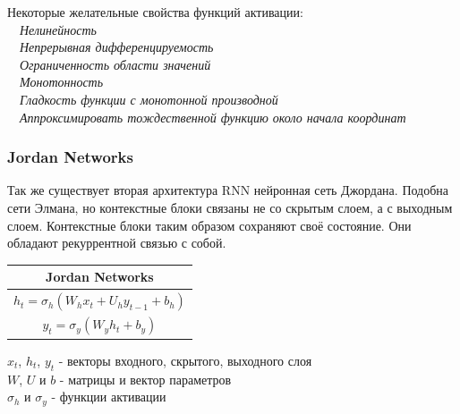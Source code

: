 	\begin{tabbing}
	    Некоторые желательные свойства функций активации:\\
		\ \ \textit{Нелинейность} \\
		\ \ \textit{Непрерывная дифференцируемость} \\
		\ \ \textit{Ограниченность области значений} \\
		\ \ \textit{Монотонность} \\
		\ \ \textit{Гладкость функции с монотонной производной} \\
		\ \ \textit{Аппроксимировать тождественной функцию около начала координат} \\
	\end{tabbing}
	
	\subsubsection{Jordan Networks}
    
    Так же существует вторая архитектура RNN нейронная сеть Джордана. Подобна сети Элмана, но контекстные блоки связаны не со скрытым слоем, а с выходным слоем. Контекстные блоки таким образом сохраняют своё состояние. Они обладают рекуррентной связью с собой.
    
	\begin{table}[h]
			\centering
			\begin{tabular}{|c|} 
				\hline
				\textbf{Jordan Networks}  \\ 
				\hline
				$	h_{t} = \sigma_{h}(W_h x_t + U_h y_{t - 1} + b_h) $  \\
				$	y_{t} = \sigma_{y}(W_y h_t + b_y) $ \\
				\hline
			\end{tabular}
	\end{table}
	
	\begin{tabbing}
		$x_t$, $h_t$, $y_t$  - векторы входного, скрытого, выходного слоя        \\
		$W$, $U$ и $b$ - матрицы и вектор параметров       \\
		$\sigma_h$ и $\sigma_y$ - функции активации
	\end{tabbing}
	
